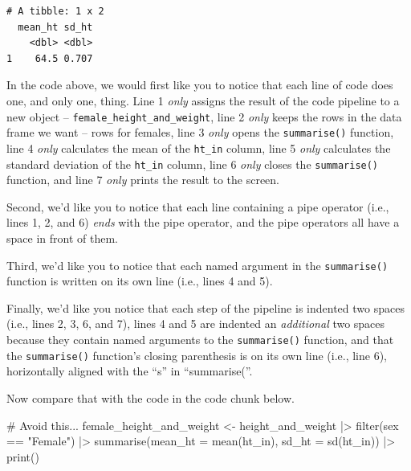 \documentclass[
  letterpaper,
  DIV=11,
  numbers=noendperiod]{scrreprt}
\newenvironment{Shaded}{\begin{snugshade}}{\end{snugshade}}
\newcommand{\AttributeTok}[1]{\textcolor[rgb]{0.40,0.45,0.13}{#1}}
\newcommand{\CommentTok}[1]{\textcolor[rgb]{0.37,0.37,0.37}{#1}}
\newcommand{\FunctionTok}[1]{\textcolor[rgb]{0.28,0.35,0.67}{#1}}
\newcommand{\NormalTok}[1]{\textcolor[rgb]{0.00,0.23,0.31}{#1}}
\newcommand{\OtherTok}[1]{\textcolor[rgb]{0.00,0.23,0.31}{#1}}
\newcommand{\SpecialCharTok}[1]{\textcolor[rgb]{0.37,0.37,0.37}{#1}}
\newcommand{\StringTok}[1]{\textcolor[rgb]{0.13,0.47,0.30}{#1}}
\begin{document}
\begin{verbatim}
# A tibble: 1 x 2
  mean_ht sd_ht
    <dbl> <dbl>
1    64.5 0.707
\end{verbatim}

In the code above, we would first like you to notice that each line of
code does one, and only one, thing. Line 1 \emph{only} assigns the
result of the code pipeline to a new object --
\texttt{female\_height\_and\_weight}, line 2 \emph{only} keeps the rows
in the data frame we want -- rows for females, line 3 \emph{only} opens
the \texttt{summarise()} function, line 4 \emph{only} calculates the
mean of the \texttt{ht\_in} column, line 5 \emph{only} calculates the
standard deviation of the \texttt{ht\_in} column, line 6 \emph{only}
closes the \texttt{summarise()} function, and line 7 \emph{only} prints
the result to the screen.

Second, we'd like you to notice that each line containing a pipe
operator (i.e., lines 1, 2, and 6) \emph{ends} with the pipe operator,
and the pipe operators all have a space in front of them.

Third, we'd like you to notice that each named argument in the
\texttt{summarise()} function is written on its own line (i.e., lines 4
and 5).

Finally, we'd like you notice that each step of the pipeline is indented
two spaces (i.e., lines 2, 3, 6, and 7), lines 4 and 5 are indented an
\emph{additional} two spaces because they contain named arguments to the
\texttt{summarise()} function, and that the \texttt{summarise()}
function's closing parenthesis is on its own line (i.e., line 6),
horizontally aligned with the ``s'' in ``summarise(''.

Now compare that with the code in the code chunk below.

\begin{Shaded}
\begin{Highlighting}[]
\CommentTok{\# Avoid this...}
\NormalTok{female\_height\_and\_weight }\OtherTok{\textless{}{-}}\NormalTok{ height\_and\_weight }\SpecialCharTok{|\textgreater{}} \FunctionTok{filter}\NormalTok{(sex }\SpecialCharTok{==} \StringTok{"Female"}\NormalTok{) }\SpecialCharTok{|\textgreater{}} 
  \FunctionTok{summarise}\NormalTok{(}\AttributeTok{mean\_ht =} \FunctionTok{mean}\NormalTok{(ht\_in), }\AttributeTok{sd\_ht =} \FunctionTok{sd}\NormalTok{(ht\_in)) }\SpecialCharTok{|\textgreater{}} \FunctionTok{print}\NormalTok{()  }
\end{Highlighting}
\end{Shaded}
\end{document}
